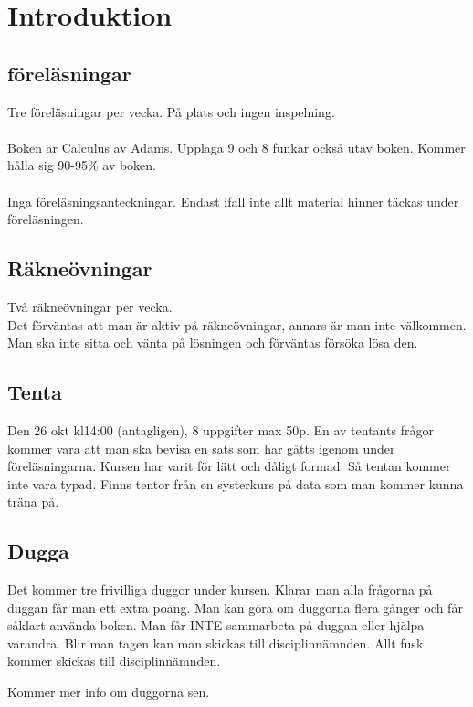 \chapter*{Introduktion}
\section*{föreläsningar}
Tre föreläsningar per vecka. På plats och ingen inspelning.\\
\\
Boken är Calculus av Adams. Upplaga 9 och 8 funkar också utav boken.
Kommer hålla sig 90-95\% av boken.\\
\\
Inga föreläsningsanteckningar.
Endast ifall inte allt material hinner täckas under föreläsningen.

\section*{Räkneövningar}
Två räkneövningar per vecka.\\
Det förväntas att man är aktiv på räkneövningar, annars är man inte välkommen.
Man ska inte sitta och vänta på lösningen och förväntas försöka lösa den.

\section*{Tenta}
Den 26 okt kl14:00 (antagligen), 8 uppgifter max 50p.
En av tentants frågor kommer vara att man ska bevisa en sats som har gåtts igenom under föreläsningarna.
Kursen har varit för lätt och dåligt formad.
Så tentan kommer inte vara typad.
Finns tentor från en systerkurs på data som man kommer kunna träna på.

\section*{Dugga}
Det kommer tre frivilliga duggor under kursen.
Klarar man alla frågorna på duggan får man ett extra poäng.
Man kan göra om duggorna flera gånger och får såklart använda boken.
Man får INTE sammarbeta på duggan eller hjälpa varandra.
Blir man tagen kan man skickas till disciplinnämnden.
Allt fusk kommer skickas till disciplinnämnden.

Kommer mer info om duggorna sen.\\